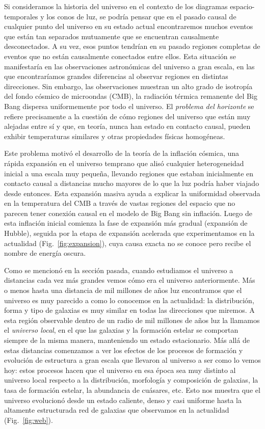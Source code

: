 Si consideramos la historia del universo en el contexto de los diagramas espacio-temporales y los conos de luz, se podría pensar que en el pasado causal de cualquier punto del universo en su estado actual encontraremos muchos eventos que están tan separados mutuamente que se encuentran causalmente desconectados. A su vez, esos puntos tendrían en su pasado regiones completas de eventos que no están causalmente conectados entre ellos. Esta situación se manifestaría en las observaciones astronómicas del universo a gran escala, en las que encontraríamos grandes diferencias al observar regiones en distintas direcciones. Sin embargo, las observaciones muestran un alto grado de isotropía del fondo cósmico de microondas (CMB), la radiación térmica remanente del Big Bang dispersa uniformemente por todo el universo. El \emph{problema del horizonte} se refiere precisamente a la cuestión de cómo regiones del universo que están muy alejadas entre sí y que, en teoría, nunca han estado en contacto causal, pueden exhibir temperaturas similares y otras propiedades físicas homogéneas.

Este problema motivó el desarrollo de la teoría de la inflación cósmica, una rápida expansión en el universo temprano que alisó cualquier heterogeneidad inicial a una escala muy pequeña, llevando regiones que estaban inicialmente en contacto causal a distancias mucho mayores de lo que la luz podría haber viajado desde entonces. Esta expansión masiva ayuda a explicar la uniformidad observada en la temperatura del CMB a través de vastas regiones del espacio que no parecen tener conexión causal en el modelo de Big Bang sin inflación. Luego de esta inflación inicial comienza la fase de expansión más gradual (expansión de Hubble), seguida por la etapa de expansión acelerada que experimentamos en la actualidad (Fig.~\ref{fig:expansion}), cuya causa exacta no se conoce pero recibe el nombre de energía oscura.



Como se mencionó en la sección pasada, cuando estudiamos el universo a distancias cada vez más grandes vemos cómo era el universo anteriormente. Más o menos hasta una distancia de mil millones de años luz encontramos que el universo es muy parecido a como lo conocemos en la actualidad: la distribución, forma y tipo de galaxias es muy similar en todas las direcciones que miremos. A esta región observable dentro de un radio de mil millones de años luz la llamamos el \emph{universo local}, en el que las galaxias y la formación estelar se comportan siempre de la misma manera, manteniendo un estado estacionario. Más allá de estas distancias comenzamos a ver los efectos de los procesos de formación y evolución de estructura a gran escala que llevaron al universo a ser como lo vemos hoy: estos procesos hacen que el universo en esa época sea muy distinto al universo local respecto a la distribución, morfología y composición de galaxias, la tasa de formación estelar, la abundancia de cuásares, etc. Esto nos muestra que el universo evolucionó desde un estado caliente, denso y casi uniforme hasta la altamente estructurada red de galaxias que observamos en la actualidad (Fig.~\ref{fig:web}).

